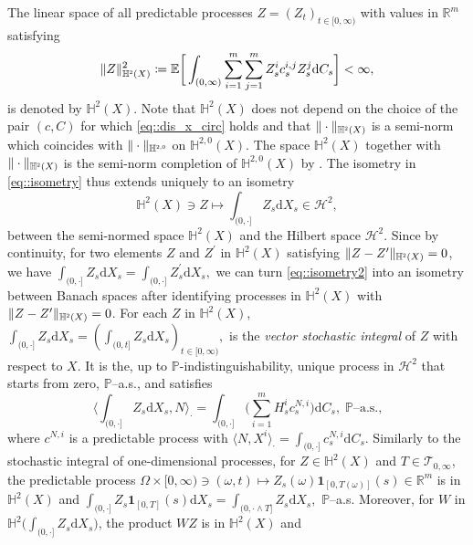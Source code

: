 \documentclass[10pt]{article} %
\newcommand\cH{\mathcal H}
\newcommand\cT{\mathcal T}
\newcommand{\smalltext}[1]{\text{\fontsize{4}{4}\selectfont$#1$}}
\def \E{\mathbb{E}}
\def \H{\mathbb{H}}
\def \P{\mathbb{P}}
\def \R{\mathbb{R}}
\def\d{\mathrm{d}}
\begin{document}
The linear space of all predictable processes $Z = (Z_t)_{t \in [0,\infty)}$ with values in $\R^m$ satisfying
\begin{equation*}
	\|Z\|^2_{\H^\smalltext{2}(X)} \coloneqq \E \bigg[ \int_{(0,\infty)}  \sum_{i=1}^m\sum_{j=1}^m Z^i_s c^{i,j}_s Z^j_s  \d C_s \bigg] < \infty,
\end{equation*}
is denoted by $\H^2(X)$. Note that $\H^2(X)$ does not depend on the choice of the pair $(c,C)$ for which \eqref{eq::dis_x_circ} holds and that $\|\cdot\|_{\H^\smalltext{2}(X)}$ is a semi-norm which coincides with $\|\cdot\|_{\H^{\smalltext{2}\smalltext{,}\smalltext{0}}}$ on $\H^{2,0}(X)$. The space $\H^2(X)$ together with $\|\cdot\|_{\H^\smalltext{2}(X)}$ is the semi-norm completion of $\H^{2,0}(X)$ by \cite[Th\'eor\`eme 4.35]{jacod1979calcul}. The isometry in \eqref{eq::isometry} thus extends uniquely to an isometry
\begin{equation}\label{eq::isometry2}
	\H^2(X) \ni Z \longmapsto \int_{(0,\cdot]} Z_s \d X_s \in \cH^2,
\end{equation}
between the semi-normed space $\H^2(X)$ and the Hilbert space $\cH^2$. Since by continuity, for two elements $Z$ and $Z^\prime$ in $\H^2(X)$ satisfying $\|Z - Z^\prime\|_{\H^\smalltext{2}(X)} = 0$, we have $\int_{(0,\cdot]} Z_s \d X_s = \int_{(0,\cdot]} Z^\prime_s \d X_s,$ we can turn \eqref{eq::isometry2} into an isometry between Banach spaces after identifying processes in $\H^2(X)$ with $\|Z-Z^\prime\|_{\H^\smalltext{2}(X)} = 0$. For each $Z$ in $\H^2(X)$, $\int_{(0,\cdot]} Z_s \d X_s = ( \int_{(0,t]} Z_s \d X_s)_{t \in [0,\infty)},$ is the \emph{vector stochastic integral} of $Z$ with respect to $X$. It is the, up to $\P$-indistinguishability, unique process in $\cH^2$ that starts from zero, $\P$--a.s., and satisfies
\begin{equation*}
	\bigg\langle \int_{(0,\cdot]} Z_s \d X_s , N \bigg\rangle_\cdot = \int_{(0,\cdot]}\bigg( \sum_{i = 1}^m H^i_s c^{N,i}_s \bigg) \d C_s, \; \text{$\P$--a.s.,}
\end{equation*}
where $c^{N,i}$ is a predictable process with $\langle N, X^i \rangle_\cdot = \int_{(0,\cdot]} c^{N,i}_s \d C_s$. Similarly to the stochastic integral of one-dimensional processes, for $Z \in \H^2(X)$ and $T \in \cT_{0,\infty}$, the predictable process $\Omega \times [0,\infty) \ni (\omega,t) \longmapsto Z_s(\omega)\mathbf{1}_{[0,T(\omega)]}(s) \in \R^m$ is in $\H^2(X)$ and $\int_{(0,\cdot]} Z_s \mathbf{1}_{[0,T]}(s) \d X_s = \int_{(0,\cdot \land T]} Z_s \d X_s,$ $\P$--a.s. Moreover, for $W$ in $\H^2 \big(\int_{(0,\cdot]}Z_s \d X_s \big)$, the product $W Z$ is in $\H^2(X)$ and
\end{document}
